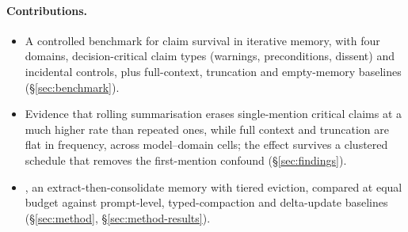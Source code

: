 \paragraph{Contributions.}
\begin{itemize}
\item A controlled benchmark for claim survival in iterative memory, with four domains, decision-critical claim types (warnings, preconditions, dissent) and incidental controls, plus full-context, truncation and empty-memory baselines (\S\ref{sec:benchmark}).
\item Evidence that rolling summarisation erases single-mention critical claims at a much higher rate than repeated ones, while full context and truncation are flat in frequency, across  model--domain cells; the effect survives a clustered schedule that removes the first-mention confound (\S\ref{sec:findings}).
\item \ledger{}, an extract-then-consolidate memory with tiered eviction, compared at equal budget against prompt-level, typed-compaction \citep{zerhoudi2026compaction} and delta-update \citep{zhang2026ace} baselines (\S\ref{sec:method}, \S\ref{sec:method-results}).
\end{itemize}

